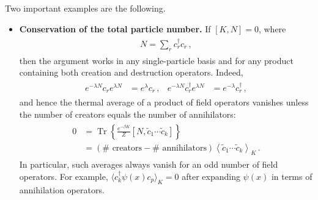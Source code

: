 \documentclass[../QFT_main.tex]{subfiles}
\begin{document}
\begin{mytheorem}
Two important examples are the following.
\begin{itemize}
    \item \textbf{Conservation of the total particle number.}
    If $[K,N]=0$, where
    {\small\begin{align}\begin{aligned}
        N=\sum_r c_r^\dagger c_r\,,
    \end{aligned}\end{align}}
    then the argument works in any single-particle basis and for any product containing both creation and destruction operators.
    Indeed,
    {\small\begin{align}\begin{aligned}
        e^{-\lambda N}c_r e^{\lambda N}&=e^\lambda c_r\,,
        &
        e^{-\lambda N}c_r^\dagger e^{\lambda N}&=e^{-\lambda}c_r^\dagger\,,
    \end{aligned}\end{align}}
    and hence the thermal average of a product of field operators vanishes unless the number of creators equals the number of annihilators:
    {\small\begin{align}\begin{aligned}
        0
        &=
        \operatorname{Tr}\left\{\tfrac{e^{-\beta K}}{Z}
        [N,\widetilde c_1\cdots\widetilde c_k]\right\}
        \\
        &=
        \left(\#\text{ creators}-\#\text{ annihilators}\right)
        \left\langle\widetilde c_1\cdots\widetilde c_k\right\rangle_K\,.
    \end{aligned}\end{align}}
    In particular, such averages always vanish for an odd number of field operators.
    For example, $\langle c_k^\dagger\psi(x)c_p\rangle_K=0$ after expanding $\psi(x)$ in terms of annihilation operators.


\end{itemize}
\end{mytheorem}
\end{document}
